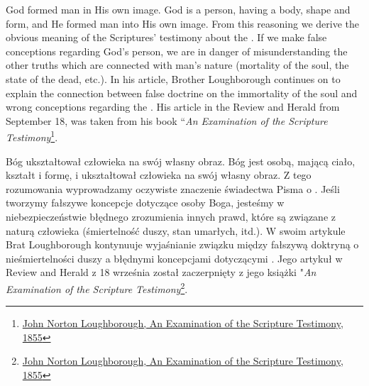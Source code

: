 

God formed man in His own image. God is a person, having a body, shape and form, and He formed man into His own image. From this reasoning we derive the obvious meaning of the Scriptures’ testimony about the . If we make false conceptions regarding God’s person, we are in danger of misunderstanding the other truths which are connected with man’s nature (mortality of the soul, the state of the dead, etc.). In his article, Brother Loughborough continues on to explain the connection between false doctrine on the immortality of the soul and wrong conceptions regarding the . His article in the Review and Herald from September 18, was taken from his book “\textit{An Examination of the Scripture Testimony}\footnote{\href{https://egwwritings.org/?ref=en_MPC.2&para=961.2}{John Norton Loughborough, An Examination of the Scripture Testimony, 1855}}.


Bóg ukształtował człowieka na swój własny obraz. Bóg jest osobą, mającą ciało, kształt i formę, i ukształtował człowieka na swój własny obraz. Z tego rozumowania wyprowadzamy oczywiste znaczenie świadectwa Pisma o . Jeśli tworzymy fałszywe koncepcje dotyczące osoby Boga, jesteśmy w niebezpieczeństwie błędnego zrozumienia innych prawd, które są związane z naturą człowieka (śmiertelność duszy, stan umarłych, itd.). W swoim artykule Brat Loughborough kontynuuje wyjaśnianie związku między fałszywą doktryną o nieśmiertelności duszy a błędnymi koncepcjami dotyczącymi . Jego artykuł w Review and Herald z 18 września został zaczerpnięty z jego książki "\textit{An Examination of the Scripture Testimony}\footnote{\href{https://egwwritings.org/?ref=en_MPC.2&para=961.2}{John Norton Loughborough, An Examination of the Scripture Testimony, 1855}}.
